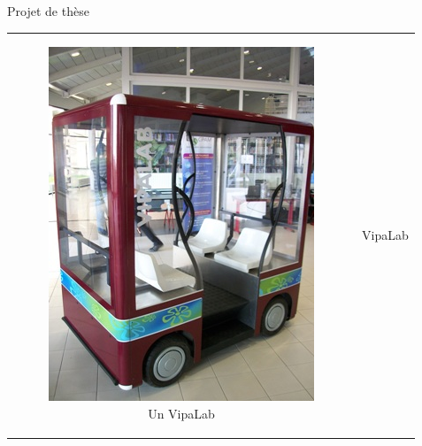\documentclass{beamer}
\begin{document}
\begin{frame}{Projet de thèse}
  \begin{tabular}{c c}
    \begin{minipage}{0.5\linewidth}
      \begin{figure}
        \includegraphics[width=0.8\linewidth]{images/VIPALAB.jpg}
        \caption{Un VipaLab}
      \end{figure}
    \end{minipage}
    &
    \begin{minipage}{0.5\linewidth}
      VipaLab
    \end{minipage}
  \end{tabular}
\end{frame}
\end{document}

